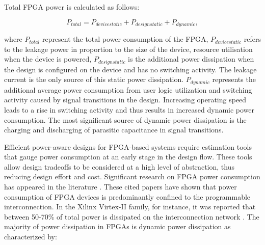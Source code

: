 Total FPGA power is calculated as follows:
\begin{center}
\begin{equation}
\label{Equ:Ptotal}
 P_{total} = P_{device static} + P_{design static} + P_{dynamic},
\end{equation}
\end{center}
where $P_{total}$ represent the total power consumption of the FPGA, $P_{device static}$ refers to the leakage power in proportion to the size of the device, resource utilisation when the device is powered, $P_{design static}$ is the additional power dissipation when the design is configured on the device and has no switching activity. The leakage current is the only source of this static power dissipation.
$P_{dynamic}$ represents the additional average power consumption from user logic utilization and switching activity caused by signal transitions in the design. Increasing operating speed leads to a rise in switching activity and thus results in increased dynamic power consumption. The most significant source of dynamic power dissipation is the charging and discharging of parasitic capacitance in signal transitions.

Efficient power-aware designs for FPGA-based systems require estimation tools that gauge power consumption at an early stage in the design flow.
These tools allow design tradeoffs to be considered at a high level of abstraction, thus reducing design effort and cost.
Significant research on FPGA power consumption has appeared in the literature \cite {Shang2002,Anderson2004a,Anderson2004,Todorovich2005,Reimer2006}.
These cited papers have shown that power consumption of FPGA devices is predominantly confined to the programmable interconnection.
In the Xilinx Virtex-II family, for instance, it was reported that between 50-70\% of total power is dissipated on the interconnection network \cite{Shang2002}.
The majority of power dissipation in FPGAs is dynamic power dissipation \cite{Shang2002} as characterized by:

